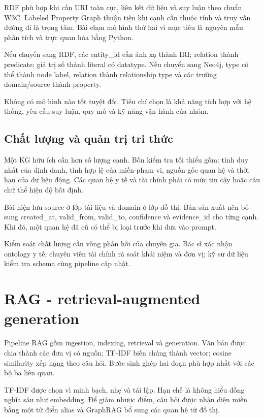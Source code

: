 RDF phù hợp khi cần URI toàn cục, liên kết dữ liệu và suy luận theo
chuẩn W3C. Labeled Property Graph thuận tiện khi cạnh cần thuộc tính và
truy vấn đường đi là trọng tâm. Bài chọn mô hình thứ hai vì mục tiêu là
nguyên mẫu phân tích và trực quan hóa bằng Python.

Nếu chuyển sang RDF, các entity\_id cần ánh xạ thành IRI; relation thành
predicate; giá trị số thành literal có datatype. Nếu chuyển sang Neo4j,
type có thể thành node label, relation thành relationship type và các
trường domain/source thành property.

Không có mô hình nào tốt tuyệt đối. Tiêu chí chọn là khả năng tích hợp
với hệ thống, yêu cầu suy luận, quy mô và kỹ năng vận hành của nhóm.

\subsection{Chất lượng và quản trị tri thức}\label{chux1ea5t-lux1b0ux1ee3ng-vuxe0-quux1ea3n-trux1ecb-tri-thux1ee9c}

Một KG hữu ích cần hơn số lượng cạnh. Bốn kiểm tra tối thiểu gồm: tính
duy nhất của định danh, tính hợp lệ của miền-phạm vi, nguồn gốc quan hệ
và thời hạn của dữ liệu động. Các quan hệ y tế và tài chính phải có mức
tin cậy hoặc câu chữ thể hiện độ bất định.

Bài hiện lưu source ở lớp tài liệu và domain ở lớp đồ thị. Bản sản xuất
nên bổ sung created\_at, valid\_from, valid\_to, confidence và
evidence\_id cho từng cạnh. Khi đó, một quan hệ đã cũ có thể bị loại
trước khi đưa vào prompt.

Kiểm soát chất lượng cần vòng phản hồi của chuyên gia. Bác sĩ xác nhận
ontology y tế; chuyên viên tài chính rà soát khái niệm và đơn vị; kỹ sư
dữ liệu kiểm tra schema cùng pipeline cập nhật.

\section{RAG - retrieval-augmented generation}\label{RAG---retrieval-augmented-generation}

Pipeline RAG gồm ingestion, indexing, retrieval và generation. Văn bản
được chia thành các đơn vị có nguồn; TF-IDF biến chúng thành vector;
cosine similarity xếp hạng theo câu hỏi. Bước sinh ghép hai đoạn phù hợp
nhất với các bộ ba liên quan.

TF-IDF được chọn vì minh bạch, nhẹ và tái lập. Hạn chế là không hiểu
đồng nghĩa sâu như embedding. Để giảm nhược điểm, câu hỏi được nhận diện
miền bằng một từ điển alias và GraphRAG bổ sung các quan hệ từ đồ thị.

